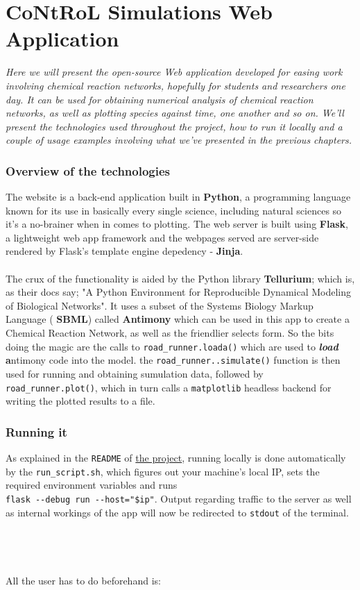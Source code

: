 \chapter{CoNtRoL Simulations Web Application}
\label{conclusions}

\par 
\textit{ Here we will present the open-source Web application developed for easing work involving chemical reaction networks, hopefully for students and researchers one day. It can be used for obtaining numerical analysis of chemical reaction networks, as well as plotting species against time, one another and so on. We'll present the technologies used throughout the project, how to run it locally and a couple of usage examples involving what we've presented in the previous chapters. }

\subsection{Overview of the technologies}
    The website is a back-end application built in \textbf{Python}, a programming language known for its use in basically every single science, including natural sciences so it's a no-brainer when in comes to plotting.   
    The web server is built using \textbf{Flask}, a lightweight web app framework and the webpages served are server-side rendered by Flask's template engine depedency - \textbf{Jinja}.\\
    \\
    The crux of the functionality is aided by the Python library \textbf{Tellurium}; which is, as their docs say; "A Python Environment for Reproducible Dynamical Modeling of Biological Networks". It uses a subset of the Systems Biology Markup Language ( \textbf{SBML}) called \textbf{Antimony} which can be used in this app to create a Chemical Reaction Network, as well as the friendlier selects form. So the bits doing the magic are the calls to \verb|road_runner.loada()| which are used to \textbf{\textit{load}}    \textbf{a}ntimony code into the model. 
        the \verb|road_runner..simulate()| function is then used for running and obtaining sumulation data, followed by \verb|road_runner.plot()|, which in turn calls a \verb|matplotlib| headless backend for writing the plotted results to a file.

    \subsection{Running it}
    As explained in the \verb|README| of \href{https://github.com/viktorashi/Open-CoNtRol}{the project}, running locally is done automatically by the \verb|run_script.sh|, which figures out your machine's local IP, sets the required environment variables and runs \\ 
    \verb|flask --debug run --host="$ip"|. Output regarding traffic to the server as well as internal workings of the app will now be redirected to \verb|stdout| of the terminal. \\\\\\\\\\
    All the user has to do beforehand is:
    
